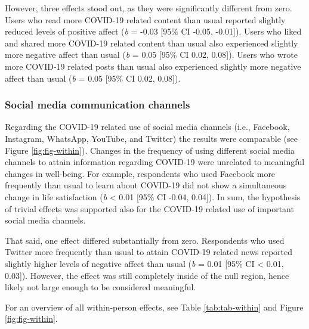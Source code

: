 \documentclass[
  man,floatsintext]{apa7}
\begin{document}
However, three effects stood out, as they were significantly different from zero.
Users who read more COVID-19 related content than usual reported slightly reduced levels of positive affect (\emph{b} = -0.03 {[}95\% CI -0.05, -0.01{]}).
Users who liked and shared more COVID-19 related content than usual also experienced slightly more negative affect than usual (\emph{b} = 0.05 {[}95\% CI 0.02, 0.08{]}).
Users who wrote more COVID-19 related posts than usual also experienced slightly more negative affect than usual (\emph{b} = 0.05 {[}95\% CI 0.02, 0.08{]}).

\hypertarget{social-media-communication-channels}{%
\subsubsection{Social media communication channels}\label{social-media-communication-channels}}

Regarding the COVID-19 related use of social media channels (i.e., Facebook, Instagram, WhatsApp, YouTube, and Twitter) the results were comparable (see Figure \ref{fig:fig-within}).
Changes in the frequency of using different social media channels to attain information regarding COVID-19 were unrelated to meaningful changes in well-being.
For example, respondents who used Facebook more frequently than usual to learn about COVID-19 did not show a simultaneous change in life satisfaction (\emph{b} \textless{} 0.01 {[}95\% CI -0.04, 0.04{]}).
In sum, the hypothesis of trivial effects was supported also for the COVID-19 related use of important social media channels.

That said, one effect differed substantially from zero.
Respondents who used Twitter more frequently than usual to attain COVID-19 related news reported slightly higher levels of negative affect than usual (\emph{b} = 0.01 {[}95\% CI \textless{} 0.01, 0.03{]}).
However, the effect was still completely inside of the null region, hence likely not large enough to be considered meaningful.

For an overview of all within-person effects, see Table \ref{tab:tab-within} and Figure \ref{fig:fig-within}.
\end{document}
